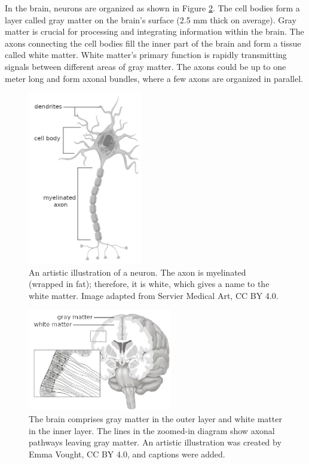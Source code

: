 In the brain, neurons are organized as shown in Figure \ref{fig:brain_matter_illustration}. The cell bodies form a layer called gray matter on the brain's surface (2.5 mm thick on average). Gray matter is crucial for processing and integrating information within the brain. The axons connecting the cell bodies fill the inner part of the brain and form a tissue called white matter. White matter's primary function is rapidly transmitting signals between different areas of gray matter. The axons could be up to one meter long and form axonal bundles, where a few axons are organized in parallel. \cite{bear_neuroscience_2016}

\begin{figure}
  \begin{center}
    \includegraphics[width=5cm]{images/manually_created/brain/neurone_II.png}
  \end{center}
  \caption[An artistic illustration of a neuron]{An artistic illustration of a neuron. The axon is myelinated (wrapped in fat); therefore, it is white, which gives a name to the white matter. Image adapted from Servier Medical Art, CC BY 4.0.}
  \label{fig:neuron_illustration}
\end{figure}

\begin{figure}
  \begin{center}
    \includegraphics[width=6.3cm]{images/manually_created/brain/brain_matter_illustration_II.png}
  \end{center}
  \caption[An artistic illustration of gray and white matter]{The brain comprises gray matter in the outer layer and white matter in the inner layer. The lines in the zoomed-in diagram show axonal pathways leaving gray matter. An artistic illustration was created by Emma Vought, CC BY 4.0, and captions were added. \cite{bonilha_gray_2015}}
  \label{fig:brain_matter_illustration}
\end{figure}

